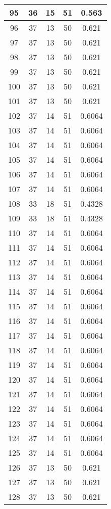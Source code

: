 \documentclass[letterpaper, 12pt]{article}
\begin{document}
\begin{longtable}{|c|c|c|c|c|}
\hline
95 & 36 & 15 & 51 & 0.563 \\
\hline
96 & 37 & 13 & 50 & 0.621 \\
\hline
97 & 37 & 13 & 50 & 0.621 \\
\hline
98 & 37 & 13 & 50 & 0.621 \\
\hline
99 & 37 & 13 & 50 & 0.621 \\
\hline
100 & 37 & 13 & 50 & 0.621 \\
\hline
101 & 37 & 13 & 50 & 0.621 \\
\hline
102 & 37 & 14 & 51 & 0.6064 \\
\hline
103 & 37 & 14 & 51 & 0.6064 \\
\hline
104 & 37 & 14 & 51 & 0.6064 \\
\hline
105 & 37 & 14 & 51 & 0.6064 \\
\hline
106 & 37 & 14 & 51 & 0.6064 \\
\hline
107 & 37 & 14 & 51 & 0.6064 \\
\hline
108 & 33 & 18 & 51 & 0.4328 \\
\hline
109 & 33 & 18 & 51 & 0.4328 \\
\hline
110 & 37 & 14 & 51 & 0.6064 \\
\hline
111 & 37 & 14 & 51 & 0.6064 \\
\hline
112 & 37 & 14 & 51 & 0.6064 \\
\hline
113 & 37 & 14 & 51 & 0.6064 \\
\hline
114 & 37 & 14 & 51 & 0.6064 \\
\hline
115 & 37 & 14 & 51 & 0.6064 \\
\hline
116 & 37 & 14 & 51 & 0.6064 \\
\hline
117 & 37 & 14 & 51 & 0.6064 \\
\hline
118 & 37 & 14 & 51 & 0.6064 \\
\hline
119 & 37 & 14 & 51 & 0.6064 \\
\hline
120 & 37 & 14 & 51 & 0.6064 \\
\hline
121 & 37 & 14 & 51 & 0.6064 \\
\hline
122 & 37 & 14 & 51 & 0.6064 \\
\hline
123 & 37 & 14 & 51 & 0.6064 \\
\hline
124 & 37 & 14 & 51 & 0.6064 \\
\hline
125 & 37 & 14 & 51 & 0.6064 \\
\hline
126 & 37 & 13 & 50 & 0.621 \\
\hline
127 & 37 & 13 & 50 & 0.621 \\
\hline
128 & 37 & 13 & 50 & 0.621 \\

\end{longtable}
\end{document}
